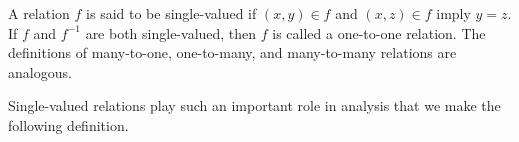 A relation $f$ is said to be single-valued if $(x, y) \in f$ and $(x, z) \in f$ imply $y = z$. If $f$ and $f^{-1}$ are both single-valued, then $f$ is called a one-to-one relation. The definitions of many-to-one, one-to-many, and many-to-many relations are analogous.

Single-valued relations play such an important role in analysis that we make the following definition.